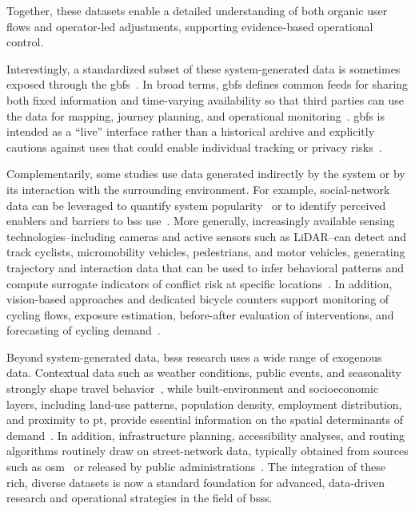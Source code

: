 Together, these datasets enable a detailed understanding of both organic user flows and operator-led adjustments, supporting evidence-based operational control.

Interestingly, a standardized subset of these system-generated data is sometimes exposed through the \ac{gbfs}~\cite{GBFS}. In broad terms, \ac{gbfs} defines common feeds for sharing both fixed information and time-varying availability so that third parties can use the data for mapping, journey planning, and operational monitoring~\cite{GBFS}. \ac{gbfs} is intended as a ``live'' interface rather than a historical archive and explicitly cautions against uses that could enable individual tracking or privacy risks~\cite{GBFS}.

Complementarily, some studies use data generated indirectly by the system or by its interaction with the surrounding environment. For example, social-network data can be leveraged to quantify system popularity~\cite{Das2015} or to identify perceived enablers and barriers to \ac{bss} use~\cite{Serna2019}. More generally, increasingly available sensing technologies--including cameras and active sensors such as LiDAR--can detect and track cyclists, micromobility vehicles, pedestrians, and motor vehicles, generating trajectory and interaction data that can be used to infer behavioral patterns and compute surrogate indicators of conflict risk at specific locations~\cite{Sayed2013, Saunier2007}. In addition, vision-based approaches and dedicated bicycle counters support monitoring of cycling flows, exposure estimation, before-after evaluation of interventions, and forecasting of cycling demand~\cite{Rogers2000, Biondi2022, Holmgren2017}.

Beyond system-generated data, \acp{bss} research uses a wide range of exogenous data. Contextual data such as weather conditions, public events, and seasonality strongly shape travel behavior~\cite{Bean2021, Julio2022, Wang2021, Park2022}, while built-environment and socioeconomic layers, including land-use patterns, population density, employment distribution, and proximity to \ac{pt}, provide essential information on the spatial determinants of demand~\cite{FaghihImani2014, FaghihImani2016, MateoBabiano2016, FaghihImani2017, Sun2018, FaghihImani2017Empirical}. In addition, infrastructure planning, accessibility analyses, and routing algorithms routinely draw on street-network data, typically obtained from sources such as \ac{osm}~\cite{Li2020, Zochowska2021} or released by public administrations~\cite{GarciaPalomares2012}. The integration of these rich, diverse datasets is now a standard foundation for advanced, data-driven research and operational strategies in the field of \acp{bss}. 



